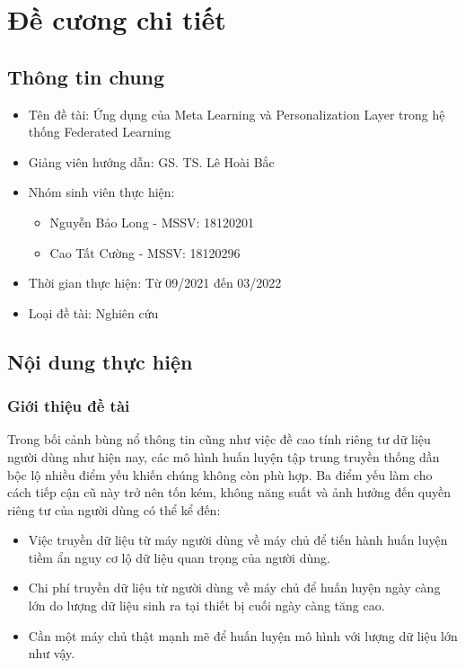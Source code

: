\chapter*{Đề cương chi tiết}
\label{proposal}

\section*{Thông tin chung}

\begin{itemize}
    \item Tên đề tài: Ứng dụng của Meta Learning và Personalization Layer trong hệ thống Federated Learning
    \item Giảng viên hướng dẫn: GS. TS. Lê Hoài Bắc
    \item Nhóm sinh viên thực hiện:
    \begin{itemize}
        \item Nguyễn Bảo Long - MSSV: 18120201
        \item Cao Tất Cường - MSSV: 18120296
    \end{itemize}

    \item Thời gian thực hiện: Từ 09/2021 đến 03/2022
    \item Loại đề tài: Nghiên cứu
\end{itemize}

\section*{Nội dung thực hiện}

\subsection*{Giới thiệu đề tài}

Trong bối cảnh bùng nổ thông tin cũng như việc đề cao tính riêng tư dữ liệu người dùng như hiện nay, các mô hình huấn luyện tập trung truyền thống dần bộc lộ nhiều điểm yếu khiến chúng không còn phù hợp. Ba điểm yếu làm cho cách tiếp cận cũ này trở nên tốn kém, không năng suất và ảnh hưởng đến quyền riêng tư của người dùng có thể kể đến:

\begin{itemize}
    \item Việc truyền dữ liệu từ máy người dùng về máy chủ để tiến hành huấn luyện tiềm ẩn nguy cơ lộ dữ liệu quan trọng của người dùng.
    \item Chi phí truyền dữ liệu từ người dùng về máy chủ để huấn luyện ngày càng lớn do lượng dữ liệu sinh ra tại thiết bị cuối ngày càng tăng cao.
    \item Cần một máy chủ thật mạnh mẽ để huấn luyện mô hình với lượng dữ liệu lớn như vậy.
\end{itemize}

